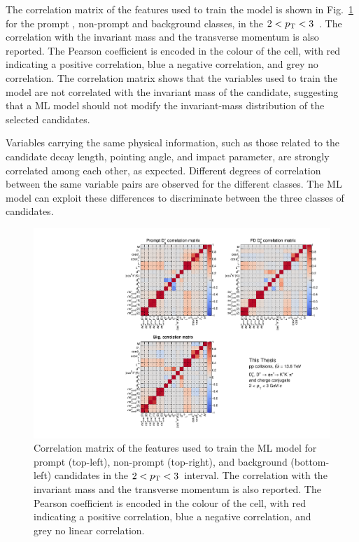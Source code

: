 \begin{sloppypar}
The correlation matrix of the features used to train the model is shown in Fig.~\ref{fig:ml_training_vars} for the prompt \ds, non-prompt \ds and background classes, in the \mbox{$2<p_\mathrm{T}<3$~\gevc}. The correlation with the invariant mass and the transverse momentum is also reported. The Pearson coefficient is encoded in the colour of the cell, with red indicating a positive correlation, blue a negative correlation, and grey no correlation. The correlation matrix shows that the variables used to train the model are not correlated with the invariant mass of the candidate, suggesting that a ML model should not modify the invariant-mass distribution of the selected candidates.
\end{sloppypar}

Variables carrying the same physical information, such as those related to the candidate decay length, pointing angle, and impact parameter, are strongly correlated among each other, as expected. Different degrees of correlation between the same variable pairs are observed for the different classes. The ML model can exploit these differences to discriminate between the three classes of candidates.

\begin{figure}[p]
    \centering
    \includegraphics[width=\textwidth]{Figures/Chapter 5/CorrelationMatrix.pdf}
    \caption{Correlation matrix of the features used to train the ML model for prompt \ds (top-left), non-prompt \ds (top-right), and background (bottom-left) candidates in the $2<p_\mathrm{T}<3$~\gevc interval. The correlation with the invariant mass and the transverse momentum is also reported. The Pearson coefficient is encoded in the colour of the cell, with red indicating a positive correlation, blue a negative correlation, and grey no linear correlation.}
    \label{fig:ml_training_vars}
\end{figure}

